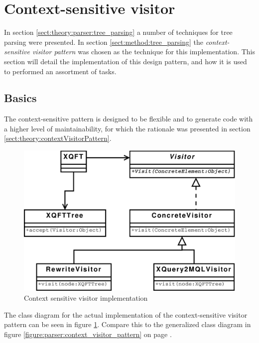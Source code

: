 \section{Context-sensitive visitor}
In section \ref{sect:theory:parser:tree_parsing} a number of techniques for
tree parsing were presented. In section \ref{sect:method:tree_parsing} the
\textit{context-sensitive visitor pattern} was chosen as the technique for this
implementation. This section will detail the implementation of this design
pattern, and how it is used to performed an assortment of tasks.

\subsection{Basics}
The context-sensitive pattern is designed to be flexible and to generate code
with a higher level of maintainability, for which the rationale was presented
in section \ref{sect:theory:contextVisitorPattern}. 

\begin{figure}[htp]
\begin{center}
  \includegraphics[scale=0.5]{diagrams/context_visitor_pattern_impl}
  \caption{Context sensitive visitor implementation}
  \label{fig:impl:context_sens_visitor_impl}
\end{center}
\end{figure}

The class diagram for the actual implementation of the context-sensitive
visitor pattern can be seen in figure \ref{fig:impl:context_sens_visitor_impl}.
Compare this to the generalized class diagram in figure
\ref{figure:parser:context_visitor_pattern} on page
\pageref{figure:parser:context_visitor_pattern}.

